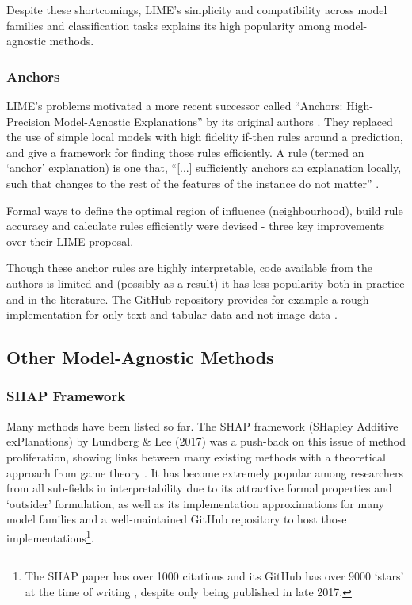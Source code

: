 \documentclass[main]{subfiles}
\begin{document}
Despite these shortcomings, LIME's simplicity and compatibility across model families and classification tasks explains its high popularity among model-agnostic methods.

\subsubsection{Anchors}

LIME's problems motivated a more recent successor called ``Anchors: High-Precision Model-Agnostic Explanations'' by its original authors \cite{anchors}. They replaced the use of simple local models with high fidelity if-then rules around a prediction, and give a framework for finding those rules efficiently. A rule (termed an `anchor' explanation) is one that, ``[...] sufficiently anchors an explanation locally, such that changes to the rest of the features of the instance do not matter'' \cite{anchors}. 

Formal ways to define the optimal region of influence (neighbourhood), build rule accuracy and calculate rules efficiently were devised - three key improvements over their LIME proposal.

Though these anchor rules are highly interpretable, code available from the authors is limited and (possibly as a result) it has less popularity both in practice and in the literature. The GitHub repository provides for example a rough implementation for only text and tabular data and not image data \cite{anchorsrepo}.

\subsection{Other Model-Agnostic Methods} \label{sec:othermodelag}

\subsubsection{SHAP Framework} 

Many methods have been listed so far. The SHAP framework (SHapley Additive exPlanations) by Lundberg \& Lee (2017) was a push-back on this issue of method proliferation, showing links between many existing methods with a theoretical approach from game theory \cite{shap}. It has become extremely popular among researchers from all sub-fields in interpretability due to its attractive formal properties and `outsider' formulation, as well as its implementation approximations for many model families and a well-maintained GitHub repository to host those implementations\footnote{The SHAP paper has over 1000 citations and its GitHub has over 9000 `stars' at the time of writing \cite{shaprepo}, despite only being published in late 2017.}.
 
\end{document}

